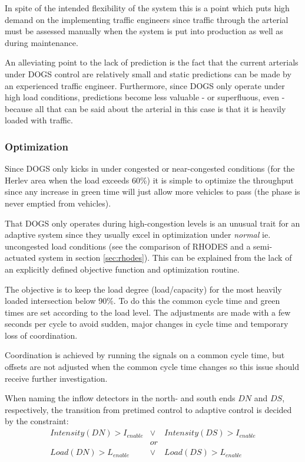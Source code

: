 In spite of the intended flexibility of the system this is a point
which puts high demand on the implementing traffic engineers since
traffic through the arterial must be assessed manually when the system
is put into production as well as during maintenance.

An alleviating point to the lack of prediction is the fact that the
current arterials under DOGS control are relatively small and static
predictions can be made by an experienced traffic
engineer. Furthermore, since DOGS only operate under high load
conditions, predictions become less valuable - or superfluous, even -
because all that can be said about the arterial in this case is that
it is heavily loaded with traffic.

\subsubsection*{Optimization}

Since DOGS only kicks in under congested or near-congested conditions
(for the Herlev area when the load exceeds 60\%) it is simple to
optimize the throughput since any increase in green time will just
allow more vehicles to pass (the phase is never emptied from
vehicles).

That DOGS only operates during high-congestion levels is an unusual trait for an adaptive system since they usually excel in optimization under \textit{normal} ie. uncongested load conditions (see the comparison of RHODES and a semi-actuated system in section \ref{sec:rhodes}). This can be explained from the lack of an explicitly defined objective function and optimization routine.

The objective is to keep the load degree (load/capacity) for the most heavily loaded intersection below 90\%.
To do this the common cycle time and green times are set according to the load level. The adjustments are made with a few seconds per cycle to avoid sudden, major changes in cycle time and temporary loss of coordination.

Coordination is achieved by running the signals on a common cycle time, but offsets are not adjusted when the common cycle time changes so this issue should receive further investigation.

When naming the inflow detectors in the north- and south ends $DN$ and $DS$, respectively, the transition from pretimed control to adaptive control is decided by the constraint:
\begin{eqnarray*}
Intensity(DN) > I_{enable} & \vee & Intensity(DS) > I_{enable} \\
& or & \\
Load(DN) > L_{enable} & \vee & Load(DS) > L_{enable}
\end{eqnarray*}

